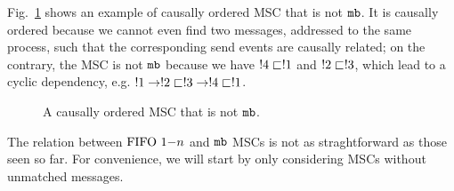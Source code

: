 Fig.~\ref{fig:co_not_none} shows an example of causally ordered MSC that is not $\mathtt{mb}$. It is causally ordered because we cannot even find two messages, addressed to the same process, such that the corresponding send events are causally related; on the contrary, the MSC is not $\mathtt{mb}$ because we have $!4 \sqsubset !1$ and $!2 \sqsubset !3$, which lead to a cyclic dependency, e.g. $!1 \to !2 \sqsubset !3 \to !4 \sqsubset !1$.

\begin{figure}[h]
	\begin{center}
		\caption{A causally ordered MSC that is not $\mathtt{mb}$.}
		\label{fig:co_not_none}
	\end{center}
\end{figure}

The relation between $\text{FIFO } 1\mathsf{-}n$ and $\mathtt{mb}$ MSCs is not as straghtforward as those seen so far. For convenience, we will start by only considering MSCs without unmatched messages. 

